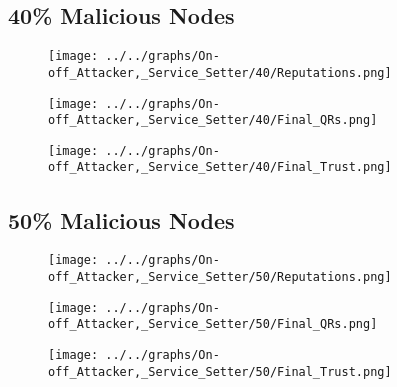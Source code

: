 \begin{minipage}[t]{0.49\columnwidth}
\subsection*{40\% Malicious Nodes}
    \begin{figure}[H]
        \centering
        \texttt{[image: ../../graphs/On-off\_Attacker,\_Service\_Setter/40/Reputations.png]}
    \end{figure}
    \begin{figure}[H]
        \centering
        \texttt{[image: ../../graphs/On-off\_Attacker,\_Service\_Setter/40/Final\_QRs.png]}
    \end{figure}
\end{minipage}
\begin{minipage}[t]{0.49\columnwidth}
    \begin{figure}[H]
        \centering
        \texttt{[image: ../../graphs/On-off\_Attacker,\_Service\_Setter/40/Final\_Trust.png]}
    \end{figure}
\end{minipage}

\begin{minipage}[t]{0.49\columnwidth}
\subsection*{50\% Malicious Nodes}
    \begin{figure}[H]
        \centering
        \texttt{[image: ../../graphs/On-off\_Attacker,\_Service\_Setter/50/Reputations.png]}
    \end{figure}
    \begin{figure}[H]
        \centering
        \texttt{[image: ../../graphs/On-off\_Attacker,\_Service\_Setter/50/Final\_QRs.png]}
    \end{figure}
\end{minipage}
\begin{minipage}[t]{0.49\columnwidth}
    \begin{figure}[H]
        \centering
        \texttt{[image: ../../graphs/On-off\_Attacker,\_Service\_Setter/50/Final\_Trust.png]}
    \end{figure}
\end{minipage}

